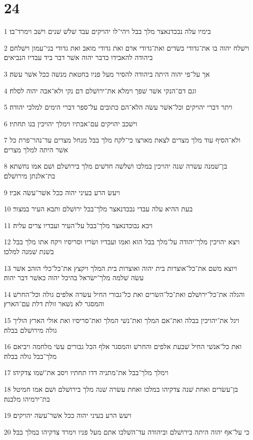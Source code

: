 \chapter{24}

\par 1 בימיו עלה נבכדנאצר מלך בבל ויהי־לו יהויקים עבד שׁלשׁ שׁנים וישׁב וימרד־בו׃
\par 2 וישׁלח יהוה בו את־גדודי כשׂדים ואת־גדודי ארם ואת גדודי מואב ואת גדודי בני־עמון וישׁלחם ביהודה להאבידו כדבר יהוה אשׁר דבר ביד עבדיו הנביאים׃
\par 3 אך על־פי יהוה היתה ביהודה להסיר מעל פניו בחטאת מנשׁה ככל אשׁר עשׂה׃
\par 4 וגם דם־הנקי אשׁר שׁפך וימלא את־ירושׁלם דם נקי ולא־אבה יהוה לסלח׃
\par 5 ויתר דברי יהויקים וכל־אשׁר עשׂה הלא־הם כתובים על־ספר דברי הימים למלכי יהודה׃
\par 6 וישׁכב יהויקים עם־אבתיו וימלך יהויכין בנו תחתיו׃
\par 7 ולא־הסיף עוד מלך מצרים לצאת מארצו כי־לקח מלך בבל מנחל מצרים עד־נהר־פרת כל אשׁר היתה למלך מצרים׃
\par 8 בן־שׁמנה עשׂרה שׁנה יהויכין במלכו ושׁלשׁה חדשׁים מלך בירושׁלם ושׁם אמו נחשׁתא בת־אלנתן מירושׁלם׃
\par 9 ויעשׂ הרע בעיני יהוה ככל אשׁר־עשׂה אביו׃
\par 10 בעת ההיא עלה עבדי נבכדנאצר מלך־בבל ירושׁלם ותבא העיר במצור׃
\par 11 ויבא נבוכדנאצר מלך־בבל על־העיר ועבדיו צרים עליה׃
\par 12 ויצא יהויכין מלך־יהודה על־מלך בבל הוא ואמו ועבדיו ושׂריו וסריסיו ויקח אתו מלך בבל בשׁנת שׁמנה למלכו׃
\par 13 ויוצא משׁם את־כל־אוצרות בית יהוה ואוצרות בית המלך ויקצץ את־כל־כלי הזהב אשׁר עשׂה שׁלמה מלך־ישׂראל בהיכל יהוה כאשׁר דבר יהוה׃
\par 14 והגלה את־כל־ירושׁלם ואת־כל־השׂרים ואת כל־גבורי החיל עשׂרה אלפים גולה וכל־החרשׁ והמסגר לא נשׁאר זולת דלת עם־הארץ׃
\par 15 ויגל את־יהויכין בבלה ואת־אם המלך ואת־נשׁי המלך ואת־סריסיו ואת אולי הארץ הוליך גולה מירושׁלם בבלה׃
\par 16 ואת כל־אנשׁי החיל שׁבעת אלפים והחרשׁ והמסגר אלף הכל גבורים עשׂי מלחמה ויביאם מלך־בבל גולה בבלה׃
\par 17 וימלך מלך־בבל את־מתניה דדו תחתיו ויסב את־שׁמו צדקיהו׃
\par 18 בן־עשׂרים ואחת שׁנה צדקיהו במלכו ואחת עשׂרה שׁנה מלך בירושׁלם ושׁם אמו חמיטל בת־ירמיהו מלבנה׃
\par 19 ויעשׂ הרע בעיני יהוה ככל אשׁר־עשׂה יהויקים׃
\par 20 כי על־אף יהוה היתה בירושׁלם וביהודה עד־השׁלכו אתם מעל פניו וימרד צדקיהו במלך בבל׃

